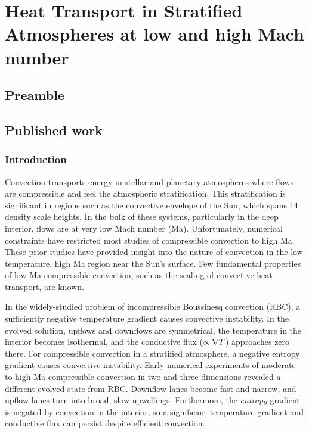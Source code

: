 \chapter{Heat Transport in Stratified Atmospheres at low and high Mach number}
\label{ch:ab17}

\section{Preamble}

\section{Published work}

\subsection{Introduction}
\label{sec:intro}
Convection transports energy in stellar and planetary atmospheres
where flows are compressible and
feel the atmospheric stratification.  This stratification 
is significant in regions such as
the convective envelope of the Sun, which spans 14 density scale heights.
In the bulk of these systems, particularly in the deep interior,
flows are at very low Mach number (Ma).  Unfortunately,
numerical constraints have restricted most studies of 
compressible convection to high Ma.
These prior studies \cite{graham1975, chan&all1982,
hurlburt&all1984, cattaneo&all1990, brummell&all1996,
brandenburg&all2005} have provided insight into the nature of
convection in the low temperature,
high Ma region near the Sun's surface. Few fundamental
properties of low Ma compressible convection, such as the scaling of
convective heat transport, are known.

In the widely-studied \RB problem of incompressible Boussinesq convection (RBC), 
a sufficiently negative temperature gradient causes convective instability.
In the evolved solution, upflows and downflows are symmetrical, the
temperature in the interior becomes isothermal, and
the conductive flux ($\propto \nabla T$) approaches 
zero there. 
For compressible convection in a stratified atmosphere, a
negative entropy gradient causes convective instability.
Early numerical experiments of moderate-to-high Ma compressible convection
in two \cite{graham1975, chan&all1982,
hurlburt&all1984, cattaneo&all1990} and three 
\cite{cattaneo&all1991, brandenburg&all2005, brummell&all1996} dimensions
revealed a different evolved state from RBC.
Downflow lanes
become fast and narrow, and upflow lanes turn into broad, slow upwellings.
Furthermore, the \emph{entropy} gradient is negated by convection in the interior, so
a significant temperature gradient and conductive flux can persist despite
efficient convection.


